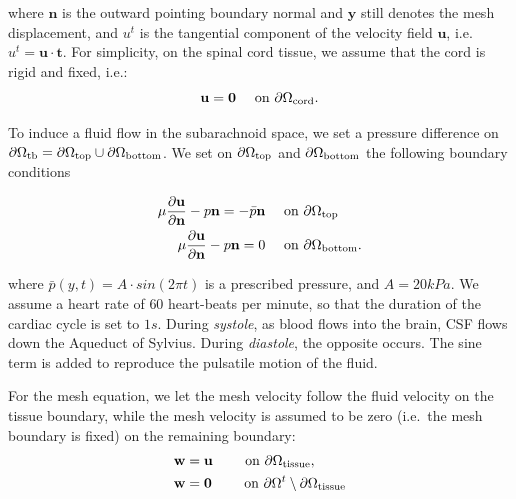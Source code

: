 \documentclass[11pt,a4paper,titlepage]{report}
\begin{document}

where $\mathbf{n}$ is the outward pointing boundary normal and
$\mathbf{y}$ still denotes the mesh displacement, and $u^t$ is the tangential component of the velocity field $\mathbf{u}$, i.e. $u^t = \mathbf{u} \cdot \mathbf{t}$. For simplicity, on
the spinal cord tissue, we assume that the cord is rigid and fixed,
i.e.:
\begin{equation}
  \mathbf{u} = \mathbf{0} \quad \text { on } \partial \Omega_{\rm cord}.
\end{equation}

To induce a fluid flow in the subarachnoid space, we set a pressure difference on $\partial \Omega_{\rm tb} = \partial \Omega_{\rm top} \cup \partial \Omega_{\rm bottom}$. We set on $\partial \Omega_{\rm top}$ and $\partial \Omega_{\rm bottom}$ the following boundary conditions

\begin{align}
\label{eq:bc:6}
\mu \frac{\partial \mathbf{u}}{\partial \mathbf{n}} - p \mathbf{n} = -\bar{p} \mathbf{n} &\quad \text { on } \partial \Omega_{\rm top} \\
\mu \frac{\partial \mathbf{u}}{\partial \mathbf{n}} - p \mathbf{n} = 0  &\quad \text { on } \partial \Omega_{\rm bottom}.
\end{align}

where $\bar{p}(y,t) = A \cdot sin(2\pi t)$ is a prescribed pressure, and $A = 20kPa$. We assume a heart rate of $60$ heart-beats per minute, so that the duration of the cardiac cycle is set to $1s$. During \textit{systole}, as blood flows into the brain, CSF flows down the Aqueduct of Sylvius. During \textit{diastole}, the opposite occurs. The sine term is added to reproduce the pulsatile motion of the fluid. 




For the mesh equation, we let the mesh velocity follow the fluid
velocity on the tissue boundary, while the mesh velocity is assumed to
be zero (i.e.~the mesh boundary is fixed) on the remaining boundary:
\begin{align}
\label{eq:bc:5}
\mathbf{w} &= \mathbf{u}  \qquad \text{ on } \partial \Omega_{\rm tissue},\\
\mathbf{w} &= \mathbf{0}  \qquad \text{ on } \partial \Omega^t \setminus \partial \Omega_{\rm tissue}
\end{align}
\end{document}

